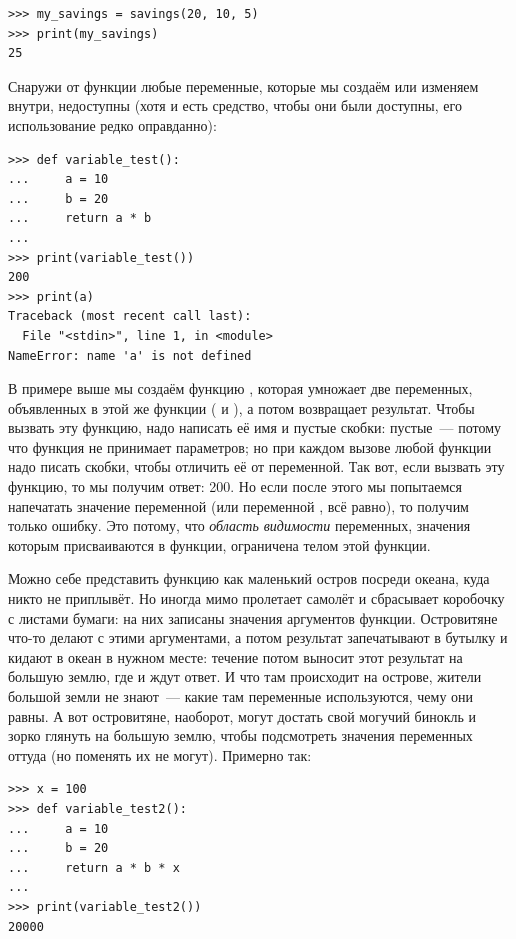 \begin{listing}
\begin{verbatim}
>>> my_savings = savings(20, 10, 5)
>>> print(my_savings)
25
\end{verbatim}
\end{listing}

Снаружи от функции любые переменные, которые мы создаём или изменяем внутри, недоступны (хотя и есть средство, чтобы они были доступны, его использование редко оправданно):

\begin{listing}
\begin{verbatim}
>>> def variable_test():
...     a = 10
...     b = 20
...     return a * b
...
>>> print(variable_test())
200
>>> print(a)
Traceback (most recent call last):
  File "<stdin>", line 1, in <module>
NameError: name 'a' is not defined
\end{verbatim}
\end{listing} 

В примере выше мы создаём функцию , которая умножает две переменных, объявленных в этой же функции ( и ), а потом возвращает результат. Чтобы вызвать эту функцию, надо написать её имя и пустые скобки: пустые — потому что функция не принимает параметров; но при каждом вызове любой функции надо писать скобки, чтобы отличить её от переменной. Так вот, если вызвать эту функцию, то мы получим ответ: 200. Но если после этого мы попытаемся напечатать значение переменной  (или переменной , всё равно), то получим только ошибку. Это потому, что \emph{область видимости} переменных, значения которым присваиваются в функции, ограничена телом этой функции.

Можно себе представить функцию как маленький остров посреди океана, куда никто не приплывёт. Но иногда мимо пролетает самолёт и сбрасывает коробочку с листами бумаги: на них записаны значения аргументов функции. Островитяне что-то делают с этими аргументами, а потом результат запечатывают в бутылку и кидают в океан в нужном месте: течение потом выносит этот результат на большую землю, где и ждут ответ. И что там происходит на острове, жители большой земли не знают — какие там переменные используются, чему они равны. А вот островитяне, наоборот, могут достать свой могучий бинокль и зорко глянуть на большую землю, чтобы подсмотреть значения переменных оттуда (но поменять их не могут). Примерно так:

\begin{listing}
\begin{verbatim}
>>> x = 100
>>> def variable_test2():
...     a = 10
...     b = 20
...     return a * b * x
... 
>>> print(variable_test2())
20000
\end{verbatim}
\end{listing}

